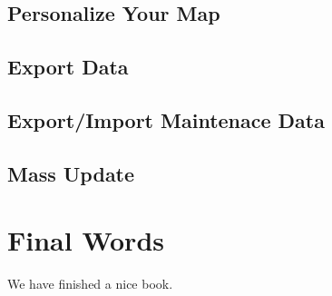 \documentclass[]{book}
\begin{document}
\hypertarget{personalize-your-map}{%
\section{Personalize Your Map}\label{personalize-your-map}}

\hypertarget{export-data}{%
\section{Export Data}\label{export-data}}

\hypertarget{exportimport-maintenace-data}{%
\section{Export/Import Maintenace
Data}\label{exportimport-maintenace-data}}

\hypertarget{mass-update}{%
\section{Mass Update}\label{mass-update}}

\hypertarget{summary}{%
\chapter{Final Words}\label{summary}}

We have finished a nice book.


\end{document}

